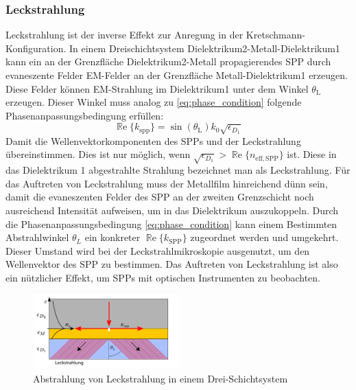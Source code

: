 \documentclass[titlepage]{article}
\renewcommand{\Re}{\operatorname{\mathbb{R}e}}
\begin{document}
		\subsubsection{Leckstrahlung}
		\label{sec:leakage_radiation}
			Leckstrahlung ist der inverse Effekt zur Anregung in der Kretschmann-Konfiguration. In einem Dreischichtsystem Dielektrikum2-Metall-Dielektrikum1 kann ein an der Grenzfläche Dielektrikum2-Metall propagierendes SPP durch evaneszente Felder EM-Felder an der Grenzfläche Metall-Dielektrikum1 erzeugen. Diese Felder können EM-Strahlung im Dielektrikum1 unter dem Winkel $\theta_\mathrm{L}$ erzeugen. Dieser Winkel muss analog zu \eqref{eq:phase_condition} folgende Phasenanpassungsbedingung erfüllen:
			\begin{equation}
				\label{eq:phase_condition}
				\boxed{\Re\{k_{\mathrm{spp}}\}=\sin(\theta_\mathrm{L}) k_0 \sqrt{\epsilon_{D_1}}}
			\end{equation}
			Damit die Wellenvektorkomponenten des SPPs und der Leckstrahlung übereinstimmen.
			 Dies ist nur möglich, wenn {$\sqrt{\epsilon_{D_1}} > \Re\{n_\mathrm{eff, SPP}\}$} ist. Diese in das Dielektrikum 1 abgestrahlte Strahlung bezeichnet man als Leckstrahlung. Für das Auftreten von Leckstrahlung muss der Metallfilm hinreichend dünn sein, damit die evaneszenten Felder des  SPP an der zweiten Grenzschicht noch ausreichend Intensität aufweisen, um in das Dielektrikum auszukoppeln. Durch die Phasenanpassungsbedingung \eqref{eq:phase_condition} kann einem Bestimmten Abstrahlwinkel $\theta_L$ ein konkreter $\Re\{k_{\mathrm{SPP}}\}$ zugeordnet werden und umgekehrt. Dieser Umstand wird bei der Leckstrahlmikroskopie ausgenutzt, um den Wellenvektor des SPP zu bestimmen. Das Auftreten von Leckstrahlung ist also ein nützlicher Effekt, um SPPs mit optischen Instrumenten zu beobachten.
				\begin{figure}[h] 
				\centering
				\includegraphics[width=0.5\textwidth]{figures/leckstrahlung.pdf}
				\caption{Abstrahlung von Leckstrahlung in einem Drei-Schichtsystem}
				\label{fig:leakage_radiation}
			\end{figure}
\end{document}
